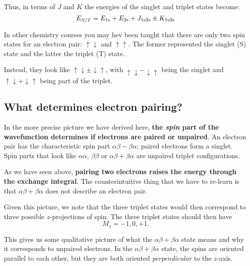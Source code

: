 \documentclass[a4paper]{tufte-handout}
\theoremstyle{definition}
\begin{document}
Thus, in terms of $J$ and $K$ the energies of the singlet and triplet states become:
\begin{equation*}
  E_{S/T} = E_{1\ce{s}} + E_{2\ce{s}} + J_{1\ce{s}2\ce{s}} \pm  K_{1\ce{s}2\ce{s}}
\end{equation*}

In other chemistry courses you may hev been taught that there are only two spin states for an electron pair: $\uparrow \downarrow$ and $\uparrow \uparrow$. The
former represented the singlet (S) state and the latter the triplet (T) state.

Instead, they look like $\uparrow \downarrow \pm \downarrow \uparrow$, with $\uparrow \downarrow - \downarrow \uparrow$ being the singlet and
$\uparrow \downarrow + \downarrow \uparrow$ being part of the triplet.

\subsection*{What determines electron pairing?}

In the more precise picture we have derived here, \textbf{the \textit{spin} part of the wavefunction determines 
if electrons are paired or unpaired}. An electron pair has the characteristic spin part $\alpha \beta - \beta \alpha$; paired 
electrons form a singlet. Spin parts that look like $\alpha \alpha$, $\beta \beta$ or $\alpha \beta + \beta \alpha$ are unpaired triplet configurations.

As we have seen above,  \textbf{pairing two electrons raises the energy through the exchange integral}. The
counterintuitive thing that we have to re-learn is that $\alpha \beta + \beta \alpha$ does not describe an electron pair.

Given this picture, we note that the three triplet states would then correspond to three possible $z$-projections of spin. The three triplet states should then have
\begin{equation*}
  M_s = -1, 0, +1.
\end{equation*}

This gives us some qualitative picture of what the $\alpha \beta + \beta \alpha$ state means and why it corresponds to unpaired electrons. In the
$\alpha \beta + \beta \alpha$ state, the spins are oriented parallel to each other, but they are both oriented \textit{perpendicular} to the $z$-axis.



\end{document}
